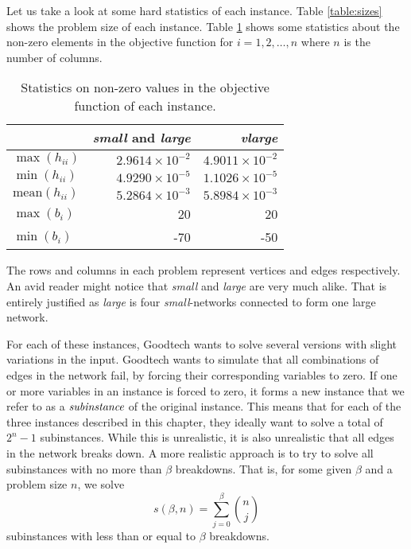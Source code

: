 Let us take a look at some hard statistics of each instance.
Table \ref{table:sizes} shows the problem size of each instance.
Table \ref{table:maxmin} shows some statistics about the non-zero elements in
the objective function for $i = 1,2,\ldots,n$ where $n$ is the number of
columns.
\begin{table}[ht!]
    \centering
    \caption{Statistics on non-zero values in the objective function of
each instance.}

    \begin{tabular}{lrr}
      & \textit{small} and \textit{large}         & \textit{vlarge} \\\hline
    $\max(h_{ii})$      & $2.9614 \times 10^{-2}$ & $4.9011 \times 10^{-2}$ \\
    $\min(h_{ii})$      & $4.9290 \times 10^{-5}$ & $1.1026 \times 10^{-5}$ \\
$\textrm{mean}(h_{ii})$ & $5.2864 \times 10^{-3}$ & $5.8984 \times 10^{-3}$ \\
    $\max(b_{i})$       & 20                      & 20 \\
    $\min(b_{i})$       & -70                     & -50 \\
    \end{tabular}
    \label{table:maxmin}
\end{table}
The rows and columns in each problem represent vertices and edges respectively.
An avid reader might notice that \textit{small} and \textit{large} are very
much alike.
That is entirely justified as \textit{large} is four \textit{small}-networks
connected to form one large network.

For each of these instances, Goodtech wants to solve several versions
with slight variations in the input.
Goodtech wants to simulate that all combinations of edges in the network
fail, by forcing their corresponding variables to zero.
If one or more variables in an instance is forced to zero, it forms a new
instance that we refer to as a $\emph{subinstance}$ of the original instance.
This means that for each of the three instances described in this chapter,
they ideally want to solve a total of $2^n - 1$ subinstances. While this is
unrealistic, it is also unrealistic that all edges in the network breaks down.
A more realistic approach is to try to solve all subinstances with no more than
$\beta$ breakdowns. That is, for some given $\beta$ and a problem size $n$, we solve
\[
s(\beta, n) = \sum_{j=0}^\beta {\binom{n}{j}}
\]
subinstances with less than or equal to $\beta$ breakdowns.
